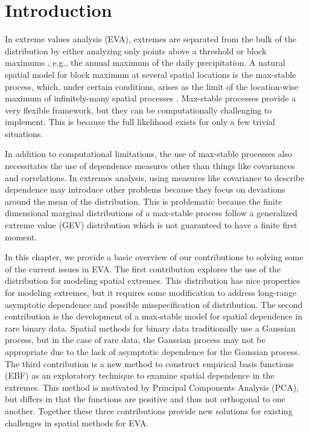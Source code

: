 \chapter{Introduction}
\label{chap:one}

In extreme values analysis (EVA), extremes are separated from the bulk of the distribution by either analyzing only points above a threshold or block maximums \citep{Coles2001}, e.g., the annual maximum of the daily precipitation.
A natural spatial model for block maximum at several spatial locations is the max-stable process, which, under certain conditions, arises as the limit of the location-wise maximum of infinitely-many spatial processes \citep{deHaan2006}.
Max-stable processes provide a very flexible framework, but they can be computationally challenging to implement.
This is because the full likelihood exists for only a few trivial situations.

In addition to computational limitations, the use of max-stable processes also necessitates the use of dependence measures other than things like covariances and correlations.
In extremes analysis, using measures like covariance to describe dependence may introduce other problems because they focus on deviations around the mean of the distribution.
This is problematic because the finite dimensional marginal distributions of a max-stable process follow a generalized extreme value (GEV) distribution which is not guaranteed to have a finite first moment.

In this chapter, we provide a basic overview of our contributions to solving some of the current issues in EVA.
The first contribution explores the use of the \skewt distribution for modeling spatial extremes.
This distribution has nice properties for modeling extremes, but it requires some modification to address long-range asymptotic dependence and possible misspecification of distribution.
The second contribution is the development of a max-stable model for spatial dependence in rare binary data.
Spatial methods for binary data traditionally use a Gaussian process, but in the case of rare data, the Gaussian process may not be appropriate due to the lack of asymptotic dependence for the Gaussian process.
The third contribution is a new method to construct empirical basis functions (EBF) as an exploratory technique to examine spatial dependence in the extremes.
This method is motivated by Principal Components Analysis (PCA), but differs in that the functions are positive and thus not orthogonal to one another.
Together these three contributions provide new solutions for existing challenges in spatial methods for EVA.

